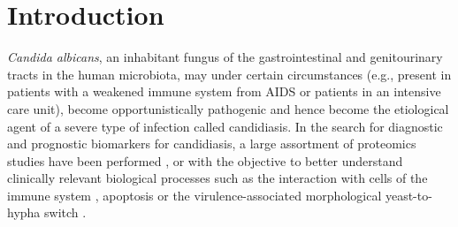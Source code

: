 \newpage

\section*{Introduction}

\textit{Candida albicans}, an inhabitant fungus of the gastrointestinal and genitourinary tracts in the
human microbiota, may under certain circumstances (e.g., present in patients with a
weakened immune system from AIDS or patients in an intensive care unit), become
opportunistically pathogenic and hence become the etiological agent of a severe type of
infection called candidiasis. In the search for diagnostic and prognostic biomarkers for
candidiasis, a large assortment of proteomics studies have been performed \citep{Pitarch2011}, or with the
objective to better understand clinically relevant biological processes such as the interaction
with cells of the immune system \citep{Fernandez-Arenas2007,Cheng2012a,Gow2011}, 
apoptosis \citep{Ramsdale2008,Hao2013c} or the virulence-associated
morphological yeast-to-hypha switch \citep{Monteoliva2010,Vialas2012}. 

